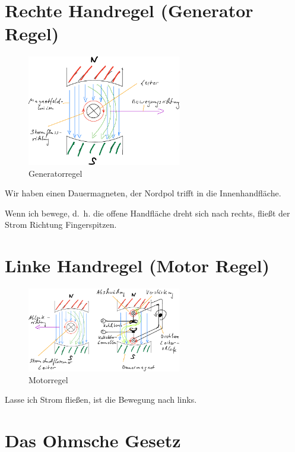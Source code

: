 \section{Rechte Handregel (Generator
Regel)}\label{rechte-handregel-generator-regel}

\begin{figure}[!ht]%
\centering
\includegraphics[width=0.6\textwidth]{images/Skizze/01_Generatorregel_Skizze.pdf}
\caption{Generatorregel}
\end{figure}

Wir haben einen Dauermagneten, der Nordpol trifft in die
Innenhandfläche.

Wenn ich bewege, d.~h. die offene Handfläche dreht sich nach rechts,
fließt der Strom Richtung Fingerspitzen.

\section{Linke Handregel (Motor
Regel)}\label{linke-handregel-motor-regel}

\begin{figure}[!ht]%
\centering
\includegraphics[width=0.6\textwidth]{images/Skizze/02_Motorregel_Skizze.pdf}
\caption{Motorregel}
\end{figure}

Lasse ich Strom fließen, ist die Bewegung nach links.

\section{Das Ohmsche Gesetz}\label{das-ohmsche-gesetz}


